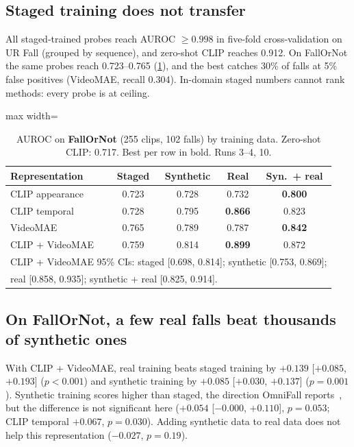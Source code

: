 \documentclass[10pt,twocolumn,letterpaper]{article}
\begin{document}
\subsection{Staged training does not transfer}
All staged-trained probes reach AUROC $\ge0.998$ in five-fold cross-validation on UR Fall (grouped by sequence), and zero-shot CLIP reaches 0.912. On FallOrNot the same probes reach 0.723--0.765 (\cref{tab:fallornot}), and the best catches 30\% of falls at 5\% false positives (VideoMAE, recall 0.304). In-domain staged numbers cannot rank methods: every probe is at ceiling.

\begin{table}[t]\centering\small
\caption{AUROC on \textbf{FallOrNot} (255 clips, 102 falls) by training data. Zero-shot CLIP: 0.717. Best per row in bold. Runs 3--4, 10.}
\label{tab:fallornot}
\begin{adjustbox}{max width=\linewidth}
\begin{tabular}{lcccc}\toprule
Representation & Staged & Synthetic & Real & Syn.\ + real\\\midrule
CLIP appearance & 0.723 & 0.728 & 0.732 & \textbf{0.800}\\
CLIP temporal & 0.728 & 0.795 & \textbf{0.866} & 0.823\\
VideoMAE & 0.765 & 0.789 & 0.787 & \textbf{0.842}\\
CLIP + VideoMAE & 0.759 & 0.814 & \textbf{0.899} & 0.872\\\midrule
\multicolumn{5}{l}{\footnotesize CLIP + VideoMAE 95\% CIs: staged [0.698, 0.814]; synthetic [0.753, 0.869];}\\[-2pt]
\multicolumn{5}{l}{\footnotesize real [0.858, 0.935]; synthetic + real [0.825, 0.914].}\\\bottomrule
\end{tabular}
\end{adjustbox}
\end{table}

\subsection{On FallOrNot, a few real falls beat thousands of synthetic ones}
With CLIP + VideoMAE, real training beats staged training by $+0.139$ [$+0.085$, $+0.193$] ($p<0.001$) and synthetic training by $+0.085$ [$+0.030$, $+0.137$] ($p=0.001$). Synthetic training scores higher than staged, the direction OmniFall reports~\cite{omnifall}, but the difference is not significant here ($+0.054$ [$-0.000$, $+0.110$], $p=0.053$; CLIP temporal $+0.067$, $p=0.030$). Adding synthetic data to real data does not help this representation ($-0.027$, $p=0.19$).
\end{document}

